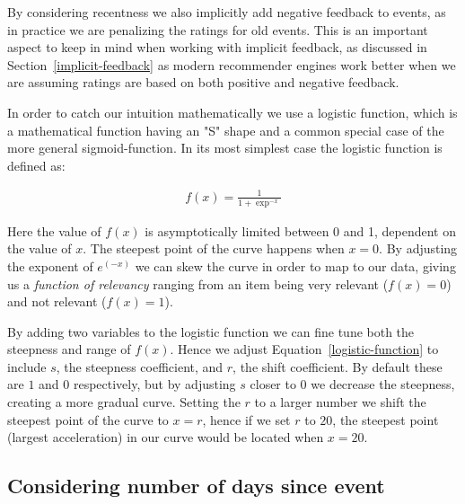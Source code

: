 By considering recentness we also implicitly add negative feedback to events,
as in practice we are penalizing the ratings for old events. This is an
important aspect to keep in mind when working with implicit feedback, as
discussed in Section~\ref{implicit-feedback} as modern recommender engines work
better when we are assuming ratings are based on both positive and negative
feedback.

In order to catch our intuition mathematically we use a logistic function, which
is a mathematical function having an "S" shape and a common special case of the
more general sigmoid-function. In its most simplest case the logistic function
is defined as:

\noindent\begin{minipage}{.45\textwidth}
  \centering
\end{minipage}
\begin{minipage}{.45\textwidth}
\begin{align}
  \label{logistic-function}
  f(x) = \frac{1}{1+\exp^{-x}}
\end{align}
\end{minipage}

Here the value of $f(x)$ is asymptotically limited between 0 and 1, dependent
on the value of $x$. The steepest point of the curve happens when $x=0$. By
adjusting the exponent of $e^(-x)$ we can skew the curve in order to map to our
data, giving us a \textit{function of relevancy} ranging from an item being
very relevant ($f(x)=0$) and not relevant ($f(x)=1$).

By adding two variables to the logistic function we can fine tune both the
steepness and range of $f(x)$. Hence we adjust Equation~\ref{logistic-function}
to include $s$, the steepness coefficient, and $r$, the shift coefficient. By
default these are $1$ and $0$ respectively, but by adjusting $s$ closer to 0 we
decrease the steepness, creating a more gradual curve. Setting the $r$ to a
larger number we shift the steepest point of the curve to $x=r$, hence if we
set $r$ to $20$, the steepest point (largest acceleration) in our curve would
be located when $x=20$.

\subsection{Considering number of days since event}

